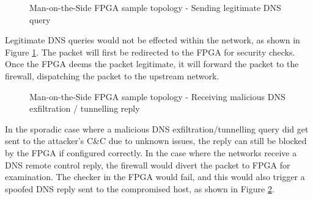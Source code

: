 \documentclass[a4paper]{report}
\begin{document}
\begin{figure}[H]
  \caption{Man-on-the-Side FPGA sample topology - Sending legitimate DNS query}
  \label{fig:man-on-the-side-FPGA-send-legit}
\end{figure}

Legitimate DNS queries would not be effected within the network, as shown in Figure \ref{fig:man-on-the-side-FPGA-send-legit}. The packet will first be redirected to the FPGA for security checks. Once the FPGA deems the packet legitimate, it will forward the packet to the firewall, dispatching the packet to the upstream network. 

\begin{figure}[H]
  \caption{Man-on-the-Side FPGA sample topology - Receiving malicious DNS exfiltration / tunnelling reply}
  \label{fig:man-on-the-side-FPGA-recv-malicious}
\end{figure}

In the sporadic case where a malicious DNS exfiltration/tunnelling query did get sent to the attacker's C\&C due to unknown issues, the reply can still be blocked by the FPGA if configured correctly. In the case where the networks receive a DNS remote control reply, the firewall would divert the packet to FPGA for examination. The checker in the FPGA would fail, and this would also trigger a spoofed DNS reply sent to the compromised host, as shown in Figure \ref{fig:man-on-the-side-FPGA-recv-malicious}.
\end{document}
